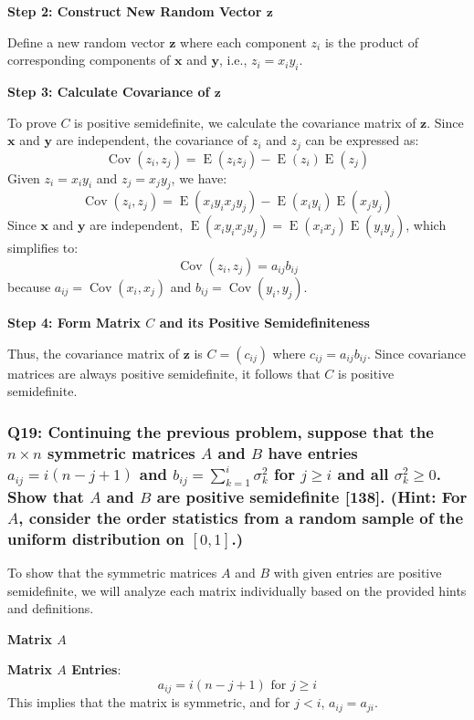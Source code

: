 \documentclass[8pt]{article}
\begin{document}
{\textbf{Step 2: Construct New Random Vector \(\mathbf{z}\)}

Define a new random vector \(\mathbf{z}\) where each component \(z_i\) is the product of corresponding components of \(\mathbf{x}\) and \(\mathbf{y}\), i.e., \(z_i = x_i y_i\). 

\textbf{Step 3: Calculate Covariance of \(\mathbf{z}\)}

To prove \(C\) is positive semidefinite, we calculate the covariance matrix of \(\mathbf{z}\). Since \(\mathbf{x}\) and \(\mathbf{y}\) are independent, the covariance of \(z_i\) and \(z_j\) can be expressed as:
\[
\operatorname{Cov}(z_i, z_j) = \operatorname{E}(z_i z_j) - \operatorname{E}(z_i) \operatorname{E}(z_j)
\]
Given \(z_i = x_i y_i\) and \(z_j = x_j y_j\), we have:
\[
\operatorname{Cov}(z_i, z_j) = \operatorname{E}(x_i y_i x_j y_j) - \operatorname{E}(x_i y_i) \operatorname{E}(x_j y_j)
\]
Since \(\mathbf{x}\) and \(\mathbf{y}\) are independent, \(\operatorname{E}(x_i y_i x_j y_j) = \operatorname{E}(x_i x_j) \operatorname{E}(y_i y_j)\), which simplifies to:
\[
\operatorname{Cov}(z_i, z_j) = a_{ij} b_{ij}
\]
because \(a_{ij} = \operatorname{Cov}(x_i, x_j)\) and \(b_{ij} = \operatorname{Cov}(y_i, y_j)\).

\textbf{Step 4: Form Matrix \(C\) and its Positive Semidefiniteness}

Thus, the covariance matrix of \(\mathbf{z}\) is \(C = (c_{ij})\) where \(c_{ij} = a_{ij} b_{ij}\). Since covariance matrices are always positive semidefinite, it follows that \(C\) is positive semidefinite.


\subsubsection*{Q19: Continuing the previous problem, suppose that the \(n \times n\) symmetric matrices \(A\) and \(B\) have entries \(a_{ij} = i(n - j + 1)\) and \(b_{ij} = \sum_{k=1}^i \sigma_k^2\) for \(j \geq i\) and all \(\sigma_k^2 \geq 0\). Show that \(A\) and \(B\) are positive semidefinite [138]. (Hint: For \(A\), consider the order statistics from a random sample of the uniform distribution on \([0, 1]\).)}

To show that the symmetric matrices \(A\) and \(B\) with given entries are positive semidefinite, we will analyze each matrix individually based on the provided hints and definitions.

\textbf{Matrix \(A\)}

\textbf{Matrix \(A\) Entries}:
\[ a_{ij} = i(n - j + 1) \text{ for } j \geq i \]
This implies that the matrix is symmetric, and for \(j < i\), \(a_{ij} = a_{ji}\).

}
\end{document}
